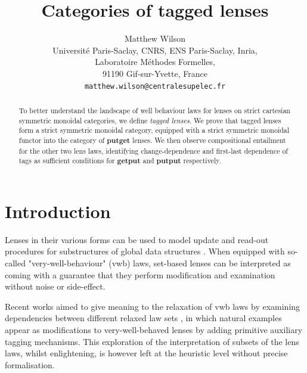 \documentclass[a4paper,11pt]{article}
\title{Categories of tagged lenses}
\author{Matthew Wilson\\
Universit\'e Paris-Saclay, CNRS, ENS Paris-Saclay, Inria,\\
Laboratoire M\'ethodes Formelles,\\
91190 Gif-sur-Yvette, France\\
\texttt{matthew.wilson@centralesupelec.fr}}
\date{}
\theoremstyle{definition}
\theoremstyle{plain}
\theoremstyle{plain}
\theoremstyle{definition}
\begin{document}
\maketitle

\begin{abstract}
To better understand the landscape of well behaviour laws for lenses on strict cartesian symmetric monoidal categories, we define \textit{tagged lenses}. We prove that tagged lenses form a strict symmetric monoidal category, equipped with a strict symmetric monoidal functor into the category of \textbf{putget} lenses. We then observe compositional entailment for the other two lens laws, identifying change-dependence and first-last dependence of tags as sufficient conditions for \textbf{getput} and \textbf{putput} respectively.     %
\end{abstract}

\section{Introduction}
Lenses in their various forms can be used to model update and read-out procedures for substructures of global data structures \cite{foster_combinators_nodate, bancilhon_update_1981}. When equipped with so-called  "very-well-behaviour" (vwb) laws, set-based lenses \cite{foster_combinators_nodate} can be interpreted as coming with a guarantee that they perform modification and examination without noise or side-effect. 

Recent works aimed to give meaning to the relaxation of vwb laws by examining dependencies between different relaxed law sets \cite{fischer_lens, nakano, lens_putput}, in which natural examples appear as modifications to very-well-behaved lenses by adding primitive auxiliary tagging mechanisms. This exploration of the interpretation of subsets of the lens laws, whilst enlightening, is however left at the heuristic level without precise formalisation. 
\end{document}
